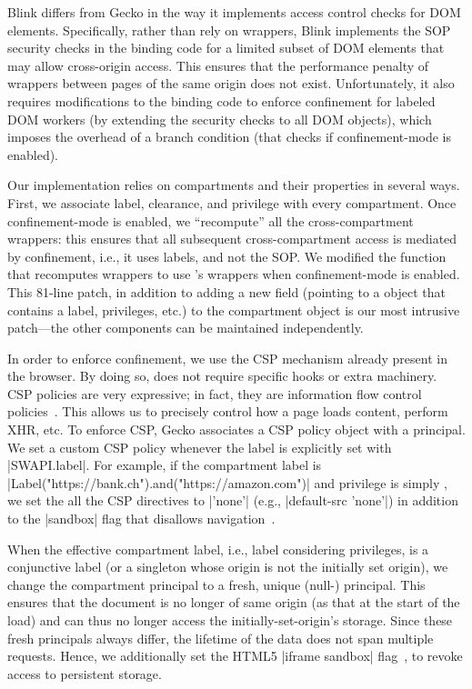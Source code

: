 Blink differs from Gecko in the way it implements access control checks for
DOM elements. 
%
Specifically, rather than rely on wrappers, Blink implements the SOP security
checks in the binding code for a limited subset of DOM elements that may allow
cross-origin access.
%
This ensures that the performance penalty of wrappers between pages of the same
origin does not exist.
%
Unfortunately, it also requires modifications to the binding code to enforce
confinement for labeled DOM workers (by extending the security checks to all
DOM objects), which imposes the overhead of a branch condition (that
checks if confinement-mode is enabled).

Our implementation relies on compartments and their properties in
several ways.
%
First, we associate label, clearance, and privilege with every 
compartment.
%
Once confinement-mode is enabled, we ``recompute'' all the
cross-compartment wrappers: this ensures that all subsequent
cross-compartment access is mediated by confinement, i.e., it uses
labels, and not the SOP. %
%
We modified the function that recomputes wrappers to use \sys{}'s
wrappers when confinement-mode is enabled.
%
This 81-line patch, in addition to adding a new field (pointing to a \sys{}
object that contains a label, privileges, etc.) to the compartment
object is our most intrusive patch---the other \sys{} components can be
maintained independently.
 
%
In order to enforce confinement, we use the CSP mechanism already present 
in the browser. 
By doing so, \sys{} does not require specific hooks or extra machinery. 
CSP policies are very expressive; in fact, they are
information flow control policies~\cite{yang:2013:towards}. This allows us
to precisely control how a page loads content, perform XHR, etc.
To enforce CSP, Gecko associates a CSP policy object with a principal.
%
We set a custom CSP policy whenever the label is
explicitly set with \js|SWAPI.label|.
%
For example, if the compartment label is
\js|Label("https://bank.ch").and("https://amazon.com")| and privilege
is simply , we set the all the CSP directives to
\js|'none'| (e.g., \js|default-src 'none'|) in addition to the
\js|sandbox| flag that disallows
navigation~\cite{csp1.1,whatwg-html,html5}.
%

When the effective compartment label, i.e., label considering
privileges, is a conjunctive label (or a singleton whose origin is not
the initially set origin), we change the compartment principal to a
fresh, unique (null-) principal. 
%
This ensures that the document is no longer of same origin (as that
at the start of the load) and can thus no longer access the
initially-set-origin's storage.
%
Since these fresh principals always differ, the lifetime of the data does not
span multiple requests.
%
Hence, we additionally set the HTML5 \js|iframe sandbox| flag~\cite{html5},
to revoke access to persistent storage.


